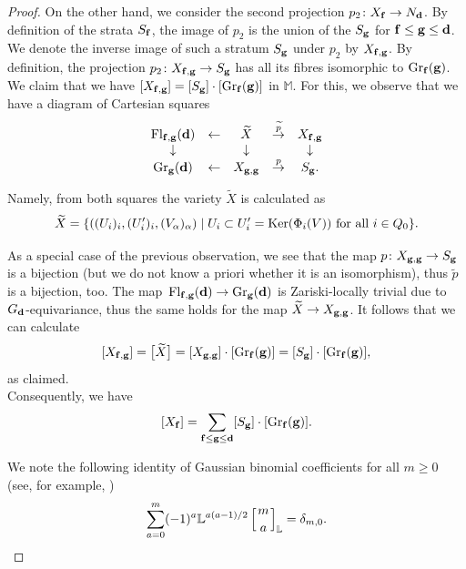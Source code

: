 \documentclass[pdftex]{sigma}
\numberwithin{equation}{section}
\theoremstyle{definition}
\begin{document}
\begin{proof}
On the other hand, we consider the second projection $p_2\colon X_{\bf f}\rightarrow N_{\bf d}$. By definition of the strata $S_{\bf f}$, the image of $p_2$ is the union of the $S_{\bf g}$ for ${\bf f}\leq{\bf g}\leq{\bf d}$. We denote the inverse image of such a stratum $S_{\bf g}$ under $p_2$ by $X_{{\bf f},{\bf g}}$. By definition, the projection
$p_2\colon X_{{\bf f},{\bf g}}\rightarrow S_{\bf g}$
has all its fibres isomorphic to ${\rm Gr}_{\bf f}({\bf g})$. We claim that we have
$[X_{{\bf f},{\bf g}}]=[S_{\bf g}]\cdot[{\rm Gr}_{\bf f}({\bf g})]$
in $\mathbb{M}$. For this, we observe that we have a diagram of Cartesian squares
\[
\begin{array}{ccccc}{\rm Fl}_{{\bf f},{\bf g}}({\bf d})&\leftarrow&\widetilde{X}&\stackrel{\widetilde{p}}{\rightarrow}&X_{{\bf f},{\bf g}}\\\downarrow&&\downarrow&&\downarrow\\
{\rm Gr}_{\bf g}({\bf d})&\leftarrow&X_{{\bf g},{\bf g}}&\stackrel{p}{\rightarrow}&S_{\bf g}.\end{array}
\]

Namely, from both squares the variety $\widetilde{X}$ is calculated as
\[\widetilde{X}=\{((U_i)_i,(U_i')_i,(V_\alpha)_\alpha) \mid U_i\subset U_i'={\rm Ker}(\Phi_i(V))\mbox{ for all }i\in Q_0\}.\]

As a special case of the previous observation, we see that the map $p\colon X_{{\bf g},{\bf g}}\rightarrow S_{\bf g}$ is a bijection (but we do not know a priori whether it is an isomorphism), thus $\widetilde{p}$ is a bijection, too. The map~${{\rm Fl}_{{\bf f},{\bf g}}({\bf d})\rightarrow{\rm Gr}_{\bf g}({\bf d})}$ is Zariski-locally trivial due to $G_{\bf d}$-equivariance, thus the same holds for the map $\widetilde{X}\rightarrow X_{{\bf g},{\bf g}}$. It follows that we can calculate
\[[X_{{\bf f},{\bf g}}]=\big[\widetilde{X}\big]=[X_{{\bf g},{\bf g}}]\cdot[{\rm Gr}_{\bf f}({\bf g})]=[S_{\bf g}]\cdot[{\rm Gr}_{\bf f}({\bf g})],\]
as claimed.\\[1ex]
Consequently, we have
\[[X_{\bf f}]=\sum_{{\bf f}\leq{\bf g}\leq{\bf d}}[S_{\bf g}]\cdot[{\rm Gr}_{\bf f}({\bf g})].\]

We note the following identity of Gaussian binomial coefficients for all $m\geq 0$ (see, for example, \cite[equation~(3.14)]{RCounting})
\[\sum_{a=0}^m(-1)^a\mathbb{L}^{a(a-1)/2}\left[{m\atop a}\right]_\mathbb{L}=\delta_{m,0}.\]



\end{proof}
\end{document}
